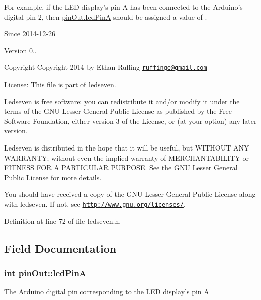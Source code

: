 For example, if the L\+E\+D display's pin A has been connected to the Arduino's digital pin 2, then {\ttfamily \hyperlink{structpin_out_a54c52aca2a7fdccb479c5a6913990e63}{pin\+Out.\+led\+Pin\+A}} should be assigned a value of {}.

\begin{DoxySince}{Since}
2014-\/12-\/26 
\end{DoxySince}
\begin{DoxyVersion}{Version}
0..
\end{DoxyVersion}
\begin{DoxyCopyright}{Copyright}
Copyright 2014 by Ethan Ruffing \href{mailto:ruffinge@gmail.com}{\tt ruffinge@gmail.\+com}
\end{DoxyCopyright}
\begin{DoxyParagraph}{License\+:}
This file is part of ledseven. 
\end{DoxyParagraph}
\begin{DoxyParagraph}{}
Ledseven is free software\+: you can redistribute it and/or modify it under the terms of the G\+N\+U Lesser General Public License as published by the Free Software Foundation, either version 3 of the License, or (at your option) any later version. 
\end{DoxyParagraph}
\begin{DoxyParagraph}{}
Ledseven is distributed in the hope that it will be useful, but W\+I\+T\+H\+O\+U\+T A\+N\+Y W\+A\+R\+R\+A\+N\+T\+Y; without even the implied warranty of M\+E\+R\+C\+H\+A\+N\+T\+A\+B\+I\+L\+I\+T\+Y or F\+I\+T\+N\+E\+S\+S F\+O\+R A P\+A\+R\+T\+I\+C\+U\+L\+A\+R P\+U\+R\+P\+O\+S\+E. See the G\+N\+U Lesser General Public License for more details. 
\end{DoxyParagraph}
\begin{DoxyParagraph}{}
You should have received a copy of the G\+N\+U Lesser General Public License along with ledseven. If not, see \href{http://www.gnu.org/licenses/}{\tt http\+://www.\+gnu.\+org/licenses/}. 
\end{DoxyParagraph}


Definition at line 72 of file ledseven.\+h.



\subsection{Field Documentation}
\hypertarget{structpin_out_a54c52aca2a7fdccb479c5a6913990e63}{
\subsubsection[{led\+Pin\+A}]{\setlength{\rightskip}{0pt plus 5cm}int pin\+Out\+::led\+Pin\+A}}\label{structpin_out_a54c52aca2a7fdccb479c5a6913990e63}
The Arduino digital pin corresponding to the L\+E\+D display's pin A 

